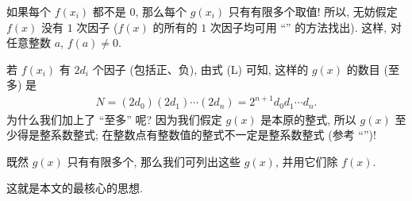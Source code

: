 如果每个 $f(x_i)$ 都不是 $0$, 那么每个 $g(x_i)$ 只有有限多个取值! 所以, 无妨假定 $f(x)$ 没有 $1$ 次因子 ($f(x)$ 的所有的 $1$ 次因子均可用 ``\RationalRootsOfPolynomialsOverQ'' 的方法找出). 这样, 对任意整数 $a$, $f(a) \neq 0$.

若 $f(x_i)$ 有 $2d_i$ 个因子 (包括正、负), 由式 (L) 可知, 这样的 $g(x)$ 的数目 (至多) 是
\begin{align*}
    N = (2d_0) (2d_1) \cdots (2d_n) = 2^{n+1} d_0 d_1 \cdots d_n.
\end{align*}
为什么我们加上了 ``至多'' 呢? 因为我们假定 $g(x)$ 是本原的整式, 所以 $g(x)$ 至少得是整系数整式; 在整数点有整数值的整式不一定是整系数整式 (参考 ``\GeneralizedBinomialCoefficients'')!

既然 $g(x)$ 只有有限多个, 那么我们可列出这些 $g(x)$, 并用它们除 $f(x)$.

这就是本文的最核心的思想.

